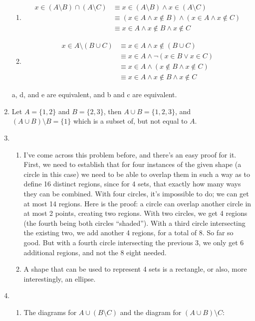 \documentclass{article}
\begin{document}
\begin{enumerate}
\begin{enumerate}
\item
  \begin{equation*}
    \begin{aligned}
      x \in (A \setminus B) \cap (A \setminus C) &\equiv x \in (A \setminus B) \land x \in (A \setminus C) \\
      &\equiv (x \in A \land x \notin B) \land (x \in A \land x \notin C) \\
      &\equiv x \in A \land x \notin B \land x \notin C
    \end{aligned}
  \end{equation*}
\item
  \begin{equation*}
    \begin{aligned}
      x \in A \setminus (B \cup C) &\equiv x \in A \land x \notin (B \cup C) \\
      &\equiv x \in A \land \lnot (x \in B \lor x \in C) \\
      &\equiv x \in A \land (x \notin B \land x \notin C) \\
      &\equiv x \in A \land x \notin B \land x \notin C
      \end{aligned}
  \end{equation*}
  \end{enumerate}
  a, d, and e are equivalent, and b and c are equivalent.
\item
  Let $A = \{1,2\}$ and $B = \{2,3\}$, then $A \cup B = \{1,2,3\}$, and $(A \cup B) \setminus B = \{1\}$ which is a subset of, but not equal to $A$.
    \item
  \begin{enumerate}
    \item
  I've come across this problem before, and there's an easy proof for it.  First, we need to establish that for four instances of the given shape (a circle in this case) we need to be able to overlap them in such a way as to define 16 distinct regions, since for 4 sets, that exactly how many ways they can be combined.	 With four circles, it's impossible to do; we can get at most 14 regions.  Here is the proof: a circle can overlap another circle in at most 2 points, creating two regions.  With two circles, we get 4 regions (the fourth being both circles ``shaded'').  With a third circle intersecting the existing two, we add another 4 regions, for a total of 8.  So far so good.  But with a fourth circle intersecting the previous 3, we only get 6 additional regions, and not the 8 eight needed.
\item
  A shape that can be used to represent 4 sets is a rectangle, or also, more interestingly, an ellipse.
  \end{enumerate}
\item
  \begin{enumerate}
    \item
  The diagrams for $A \cup (B \setminus C)$ and the diagram for $(A \cup B) \setminus C$:


\end{enumerate}
\end{enumerate}
\end{document}

